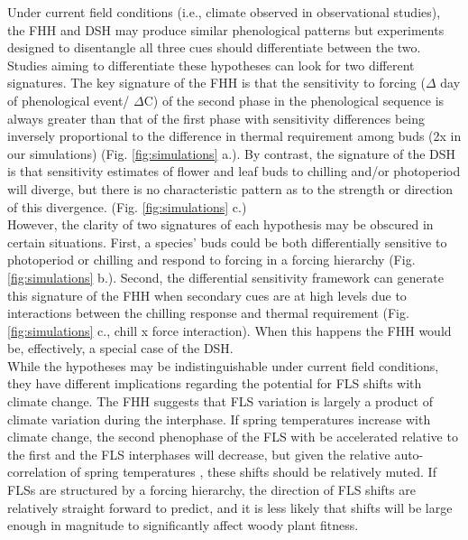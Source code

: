 \documentclass[11pt]{article}\usepackage[]{graphicx}\usepackage[]{color}
\begin{document}
\noindent Under current field conditions (i.e., climate observed in observational studies), the FHH and DSH may produce similar phenological patterns but experiments designed to disentangle all three cues should differentiate between the two. Studies aiming to differentiate these hypotheses can look for two different signatures. The key signature of the FHH is that the sensitivity to forcing ($\Delta$ day of phenological event/ $\Delta$\degree C) of the second phase in the phenological sequence is always greater than that of the first phase with sensitivity differences being inversely proportional to the difference in thermal requirement among buds (2x in our simulations) (Fig. \ref{fig:simulations} a.). By contrast, the signature of the DSH is that sensitivity estimates of flower and leaf buds to chilling and/or photoperiod will diverge, but there is no characteristic pattern as to the strength or direction of this divergence. (Fig. \ref{fig:simulations} c.)\\

\noindent However, the clarity of two signatures of each hypothesis may be obscured in certain situations. First, a species' buds could be both differentially sensitive to photoperiod or chilling and respond to forcing in a forcing hierarchy (Fig. \ref{fig:simulations} b.). Second, the differential sensitivity framework can generate this signature of the FHH when secondary cues are at high levels due to interactions between the chilling response and thermal requirement (Fig. \ref{fig:simulations} c., chill x force interaction). When this happens the FHH would be, effectively, a special case of the DSH.\\

\noident While the hypotheses may be indistinguishable under current field conditions, they have different implications regarding the potential for FLS shifts with climate change. The FHH suggests that FLS variation is largely a product of climate variation during the interphase. If spring temperatures increase with climate change, the second phenophase of the FLS with be accelerated relative to the first and the FLS interphases will decrease, but given the relative auto-correlation of spring temperatures \citep{Di-Cecco:2018aa}, these shifts should be relatively muted. If FLSs are structured by a forcing hierarchy, the direction of FLS shifts are relatively straight forward to predict, and it is less likely that shifts will be large enough in magnitude to significantly affect woody plant fitness.\\
\end{document}
